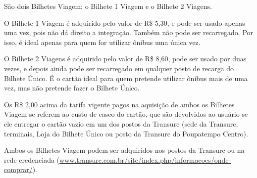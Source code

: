 São dois Bilhetes Viagem: o Bilhete 1 Viagem e o Bilhete 2 Viagens.

O Bilhete 1 Viagem é adquirido pelo valor de R\$ 5,30, e pode ser usado apenas 
uma vez, pois não dá direito a integração. Também não pode ser recarregado. 
Por isso, é ideal apenas para quem for utilizar ônibus uma única vez.

O Bilhete 2 Viagens é adquirido pelo valor de R\$ 8,60, pode ser usado por duas 
vezes, e depois ainda pode ser recarregado em qualquer posto de recarga do 
Bilhete Único. É o cartão ideal para quem pretende utilizar ônibus mais de uma vez,
mas não pretende fazer o Bilhete Único.

Os R\$ 2,00 acima da tarifa vigente pagos na aquisição de ambos os Bilhetes Viagem 
se referem ao custo de casco do cartão, que são devolvidos ao usuário se ele 
entregar o cartão vazio em um dos postos da Transurc (sede da Transurc, terminais, 
Loja do Bilhete Único ou posto da Transurc do Poupatempo Centro).

Ambos os Bilhetes Viagem podem ser adquiridos nos postos da Transurc ou na 
rede credenciada (\url{www.transurc.com.br/site/index.php/informacoes/onde-comprar/}).
